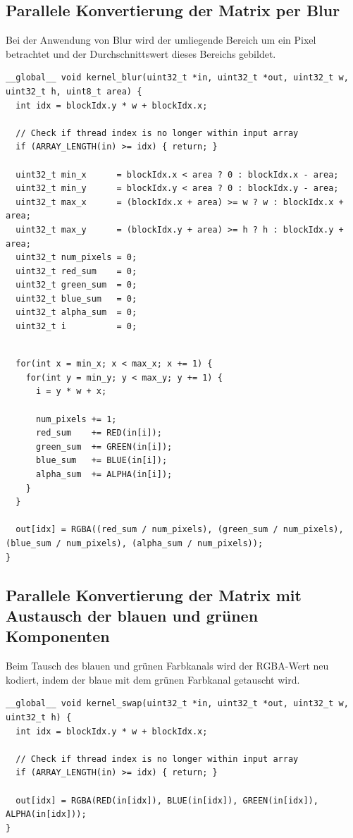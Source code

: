 \documentclass{llncs}
\begin{document}
\subsection{Parallele Konvertierung der Matrix per Blur}
%
Bei der Anwendung von Blur wird der umliegende Bereich um ein Pixel betrachtet und der Durchschnittswert dieses Bereichs gebildet.


\begin{lstlisting}
__global__ void kernel_blur(uint32_t *in, uint32_t *out, uint32_t w, uint32_t h, uint8_t area) {
  int idx = blockIdx.y * w + blockIdx.x;

  // Check if thread index is no longer within input array
  if (ARRAY_LENGTH(in) >= idx) { return; }

  uint32_t min_x      = blockIdx.x < area ? 0 : blockIdx.x - area;
  uint32_t min_y      = blockIdx.y < area ? 0 : blockIdx.y - area;
  uint32_t max_x      = (blockIdx.x + area) >= w ? w : blockIdx.x + area;
  uint32_t max_y      = (blockIdx.y + area) >= h ? h : blockIdx.y + area;
  uint32_t num_pixels = 0;
  uint32_t red_sum    = 0;
  uint32_t green_sum  = 0;
  uint32_t blue_sum   = 0;
  uint32_t alpha_sum  = 0;
  uint32_t i          = 0;
\end{lstlisting}
\newpage
\begin{lstlisting}

  for(int x = min_x; x < max_x; x += 1) {
    for(int y = min_y; y < max_y; y += 1) {
      i = y * w + x;

      num_pixels += 1;
      red_sum    += RED(in[i]);
      green_sum  += GREEN(in[i]);
      blue_sum   += BLUE(in[i]);
      alpha_sum  += ALPHA(in[i]);
    }
  }

  out[idx] = RGBA((red_sum / num_pixels), (green_sum / num_pixels), (blue_sum / num_pixels), (alpha_sum / num_pixels));
}
\end{lstlisting}
%
\subsection{Parallele Konvertierung der Matrix mit Austausch der blauen und grünen Komponenten}
%
Beim Tausch des blauen und grünen Farbkanals wird der RGBA-Wert neu kodiert, indem der blaue mit dem grünen Farbkanal getauscht wird.

\begin{lstlisting}
__global__ void kernel_swap(uint32_t *in, uint32_t *out, uint32_t w, uint32_t h) {
  int idx = blockIdx.y * w + blockIdx.x;

  // Check if thread index is no longer within input array
  if (ARRAY_LENGTH(in) >= idx) { return; }

  out[idx] = RGBA(RED(in[idx]), BLUE(in[idx]), GREEN(in[idx]), ALPHA(in[idx]));
}
\end{lstlisting}
\end{document}
